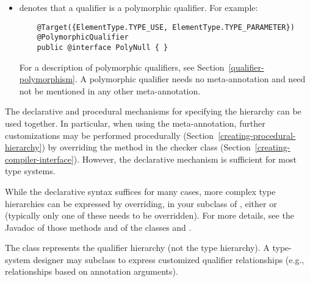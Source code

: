 \begin{itemize}
\item {} denotes that a qualifier is a
  polymorphic qualifier.  For example:

  \begin{Verbatim}
    @Target({ElementType.TYPE_USE, ElementType.TYPE_PARAMETER})
    @PolymorphicQualifier
    public @interface PolyNull { }
  \end{Verbatim}

  For a description of polymorphic qualifiers, see
  Section~\ref{qualifier-polymorphism}.  A polymorphic qualifier needs
  no  meta-annotation and need not be
  mentioned in any other 
  meta-annotation.

\end{itemize}

The declarative and procedural mechanisms for specifying the hierarchy can
be used together.  In particular, when using the 
meta-annotation, further customizations may be
performed procedurally (Section~\ref{creating-procedural-hierarchy})
by overriding the  method in the checker class
(Section~\ref{creating-compiler-interface}).
However, the declarative mechanism is sufficient for most type systems.



While the declarative syntax suffices for many cases, more complex
type hierarchies can be expressed by overriding, in your subclass of ,
either  or  (typically
only one of these needs to be overridden).
For more details, see the Javadoc of those methods and of the classes
 and .

The  class represents the qualifier hierarchy (not the
type hierarchy).  A type-system designer may subclass
 to express customized qualifier
relationships (e.g., relationships based on annotation
arguments).


